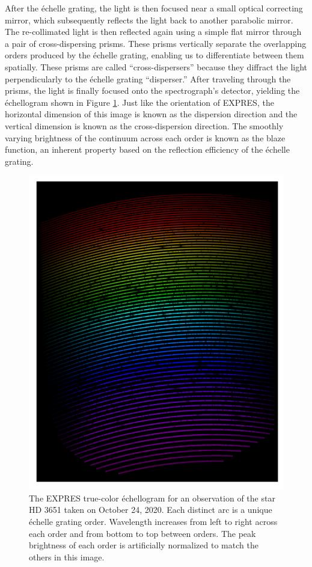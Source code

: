 After the \'echelle grating, the light is then focused near a small optical correcting mirror, which subsequently reflects the light back to another parabolic mirror. The re-collimated light is then reflected again using a simple flat mirror through a pair of cross-dispersing prisms. These prisms vertically separate the overlapping orders produced by the \'echelle grating, enabling us to differentiate between them spatially. These prisms are called ``cross-dispersers'' because they diffract the light perpendicularly to the \'echelle grating ``disperser.'' After traveling through the prisms, the light is finally focused onto the spectrograph's detector, yielding the \'echellogram shown in Figure \ref{fig:expres-format}. Just like the orientation of EXPRES, the horizontal dimension of this image is known as the dispersion direction and the vertical dimension is known as the cross-dispersion direction. The smoothly varying brightness of the continuum across each order is known as the blaze function, an inherent property based on the reflection efficiency of the \'echelle grating.

\begin{figure}
    \centering
    \includegraphics[width=\textwidth]{figures-1/expres-format.pdf}
    \caption[The EXPRES \'Echelleogram]{The EXPRES true-color \'echellogram for an observation of the star HD 3651 taken on October 24, 2020. Each distinct arc is a unique \'echelle grating order. Wavelength increases from left to right across each order and from bottom to top between orders. The peak brightness of each order is artificially normalized to match the others in this image.}
    \label{fig:expres-format}
\end{figure}

